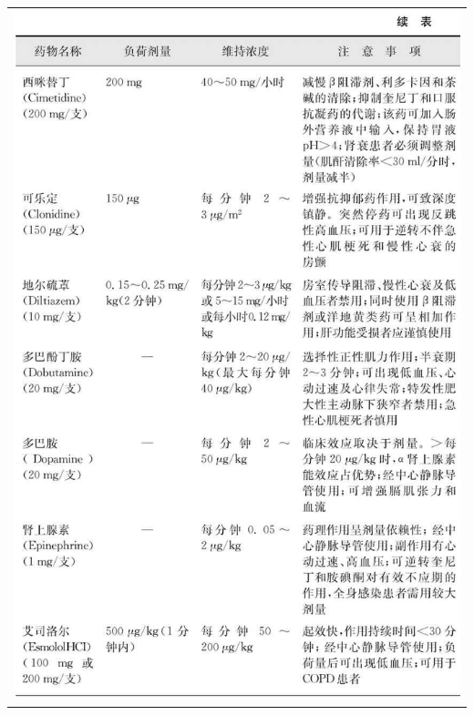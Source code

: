 \begin{longtable}{c}
\includegraphics[width=\textwidth,height=\textheight,keepaspectratio]{./images/Image00325.jpg}\\

\end{longtable}

